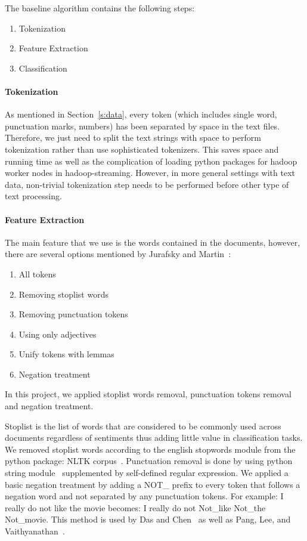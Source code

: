 The baseline algorithm contains the following steps:

\begin{enumerate}
	\item Tokenization
	\item Feature Extraction
	\item Classification
\end{enumerate}

\paragraph{Tokenization}
As mentioned in Section~\ref{s:data}, every token (which includes 
single word, punctuation marks, numbers) has been separated by space in 
the text files. Therefore, we just need to split the text strings with space to 
perform tokenization rather than use sophisticated tokenizers. This saves 
space and running time as well as the complication of loading  python 
packages for hadoop worker nodes in hadoop-streaming. However, in more 
general settings with text data, non-trivial tokenization step needs to be 
performed before other type of text processing.

\paragraph{Feature Extraction}
The main feature that we use is the words contained in the documents, 
however, there are several options mentioned by Jurafsky and 
Martin~\cite{hid-sp18-405-sentiment-jurafsky2009}: 
\begin{enumerate}
	\item All tokens
	\item Removing stoplist words
	\item Removing punctuation tokens
	\item Using only adjectives
	\item Unify tokens with lemmas
	\item Negation treatment
\end{enumerate}
In this project, we applied stoplist words removal, punctuation tokens 
removal and negation treatment. 

Stoplist is the list of words that are considered to be commonly used across 
documents regardless of sentiments thus adding little value in classification 
tasks. We removed stoplist words according to the english stopwords 
module from the python package: NLTK 
corpus~\cite{hid-sp18-405-sentiment-stopworddoc}. Punctuation removal is 
done by using python string 
module~\cite{hid-sp18-405-sentiment-punctuationdoc} supplemented by 
self-defined regular expression. We applied a basic negation treatment by 
adding a NOT\_ prefix to every token that follows a negation word and not 
separated by any punctuation tokens. For example: I really do not like the 
movie becomes: I really do not Not\_like Not\_the Not\_movie. This method is 
used by Das and Chen~\cite{hid-sp18-405-sentiment-das2001yahoo} as well 
as Pang, Lee, and 
Vaithyanathan~\cite{hid-sp18-405-sentiment-pang2002thumbs}. 


